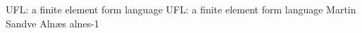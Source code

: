 \begingroup

\setcounter{chapter}{16}
\setcounter{chpnum}{16}

\newcommand{\seq}[1]{\left\langle{#1}\right\rangle}

\renewcommand{\AA}{{A}}
\newcommand{\BB}{{B}}
\newcommand{\CC}{{C}}
\newcommand{\FF}{{F}}
\newcommand{\II}{{I}}
\newcommand{\MM}{{M}}
\newcommand{\PP}{{P}}
\renewcommand{\SS}{{S}}
\newcommand{\VV}{{V}}
\newcommand{\bb}{{b}}
\newcommand{\ee}{{e}}

\newcommand{\nn}{{n}}
\newcommand{\uu}{{u}}
\newcommand{\vv}{{v}}
\newcommand{\ww}{{w}}
\newcommand{\xx}{{x}}
\newcommand{\ff}{{f}}

\newcommand{\bpsi}{\bm{\psi}}
\newcommand{\bphi}{\bm{\phi}}
\newcommand{\bPsi}{\bm{\Psi}}
\newcommand{\bPhi}{\bm{\Phi}}

\newcommand{\mI}{\mathfrak{I}}

\newcommand{\Cc}{\mathcal{C}}
\newcommand{\Dc}{\mathcal{D}}
\newcommand{\Ic}{\mathcal{I}}

\newcommand{\mop}[1]{\operatorname{#1}}
\newcommand{\spans}[1]{\mop{span}\left\{ #1 \right\}}

              {UFL: a finite element form language}
              {UFL: a finite element form language}
              {Martin Sandve Aln\ae{}s}
              {alnes-1}

